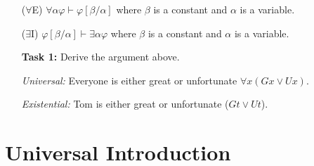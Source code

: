 \documentclass[a4paper, 11pt]{article} %
\def\therefore{\ensuremath{\ldotp\dot\,\ldotp}}
\newcommand{\unisub}[2]{[#1/#2]}
\begin{document}
\begin{enumerate}
  \item[($\forall$E)] $\forall\alpha\varphi \vdash \varphi\unisub{\beta}{\alpha}$ where $\beta$ is a constant and $\alpha$ is a variable. 
  \item[($\exists$I)] $\varphi\unisub{\beta}{\alpha} \vdash \exists\alpha\varphi$ where $\beta$ is a constant and $\alpha$ is a variable. 
  \item[\bf Task 1:] Derive the argument above.
  \item[\it Universal:] Everyone is either great or unfortunate $\forall x(Gx \vee Ux)$.
  \item[\it Existential:] Tom is either great or unfortunate ($Gt \vee Ut$).
    \begin{itemize}
    \end{itemize}
\end{enumerate}






\section*{Universal Introduction}
\end{document}
